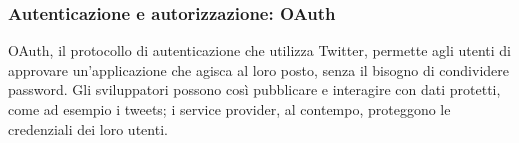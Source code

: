 	\subsubsection{Autenticazione e autorizzazione: OAuth}
		OAuth, il protocollo di autenticazione che utilizza Twitter\cite{twitter_auth}, permette agli utenti di approvare un'applicazione che agisca al loro posto, senza il bisogno di condividere password. Gli sviluppatori possono così pubblicare e interagire con dati protetti, come ad esempio i tweets; i service provider, al contempo, proteggono le credenziali dei loro utenti\cite{twitter_aut_faq}.
